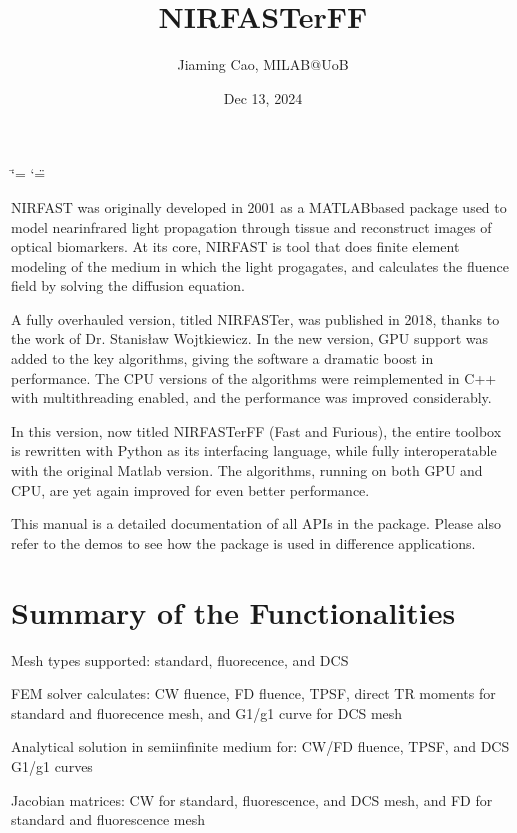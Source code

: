 \documentclass[letterpaper,10pt,english]{sphinxmanual}
\title{NIRFASTerFF}
\date{Dec 13, 2024}
\author{Jiaming Cao, MILAB@UoB}
\begin{document}
\ifdefined\shorthandoff
  \ifnum\catcode`\=\string=\active\shorthandoff{=}\fi
  \ifnum\catcode`\"=\active{}\fi
\fi

\pagestyle{empty}
\sphinxmaketitle
\pagestyle{plain}
\sphinxtableofcontents
\pagestyle{normal}
\label{\detokenize{index::doc}}


\sphinxAtStartPar
NIRFAST was originally developed in 2001 as a MATLAB\sphinxhyphen{}based package used to model near\sphinxhyphen{}infrared light propagation through tissue and reconstruct images of optical biomarkers. At its core, NIRFAST is tool that does finite element modeling of the medium in which the light progagates, and calculates the fluence field by solving the diffusion equation.

\sphinxAtStartPar
A fully overhauled version, titled NIRFASTer, was published in 2018, thanks to the work of Dr. Stanisław Wojtkiewicz. In the new version, GPU support was added to the key algorithms, giving the software a dramatic boost in performance. The CPU versions of the algorithms were re\sphinxhyphen{}implemented in C++ with multithreading enabled, and the performance was improved considerably.

\sphinxAtStartPar
In this version, now titled NIRFASTerFF (Fast and Furious), the entire toolbox is re\sphinxhyphen{}written with Python as its interfacing language, while fully inter\sphinxhyphen{}operatable with the original Matlab version. The algorithms, running on both GPU and CPU, are yet again improved for even better performance.

\sphinxAtStartPar
This manual is a detailed documentation of all APIs in the package. Please also refer to the demos to see how the package is used in difference applications.


\chapter{Summary of the Functionalities}
\label{\detokenize{index:summary-of-the-functionalities}}
\sphinxAtStartPar
Mesh types supported: standard, fluorecence, and DCS

\sphinxAtStartPar
FEM solver calculates: CW fluence, FD fluence, TPSF, direct TR moments for standard and fluorecence mesh, and G1/g1 curve for DCS mesh

\sphinxAtStartPar
Analytical solution in semi\sphinxhyphen{}infinite medium for: CW/FD fluence, TPSF, and DCS G1/g1 curves

\sphinxAtStartPar
Jacobian matrices: CW for standard, fluorescence, and DCS mesh, and FD for standard and fluorescence mesh
\end{document}

